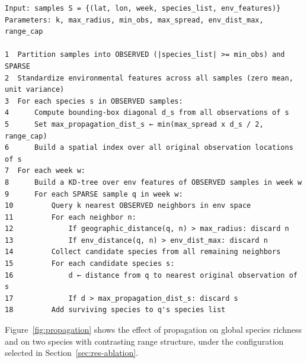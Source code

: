 \begin{algorithm}[htbp]
\centering
\begin{minipage}{\linewidth}\small\begin{verbatim}
Input: samples S = {(lat, lon, week, species_list, env_features)}
Parameters: k, max_radius, min_obs, max_spread, env_dist_max, range_cap

1  Partition samples into OBSERVED (|species_list| >= min_obs) and SPARSE
2  Standardize environmental features across all samples (zero mean, unit variance)
3  For each species s in OBSERVED samples:
4      Compute bounding-box diagonal d_s from all observations of s
5      Set max_propagation_dist_s ← min(max_spread x d_s / 2, range_cap)
6      Build a spatial index over all original observation locations of s
7  For each week w:
8      Build a KD-tree over env features of OBSERVED samples in week w
9      For each SPARSE sample q in week w:
10         Query k nearest OBSERVED neighbors in env space
11         For each neighbor n:
12             If geographic_distance(q, n) > max_radius: discard n
13             If env_distance(q, n) > env_dist_max: discard n
14         Collect candidate species from all remaining neighbors
15         For each candidate species s:
16             d ← distance from q to nearest original observation of s
17             If d > max_propagation_dist_s: discard s
18         Add surviving species to q's species list
\end{verbatim}\end{minipage}
\caption{Label propagation. Species lists are copied from well-observed cells to environmentally similar sparse cells, subject to five constraints: same week, geographic radius cap, environmental-distance gate, per-species range cap, and a kilometre ceiling on transfer distance.}
\label{alg:propagation}
\end{algorithm}

Figure~\ref{fig:propagation} shows the effect of propagation on global species richness and on two species with contrasting range structure, under the configuration selected in Section~\ref{sec:res-ablation}.

